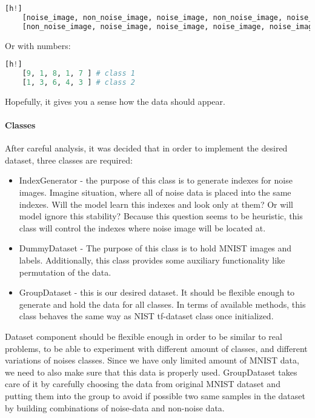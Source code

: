 \begin{lstlisting}[language=Python][h!]
	[noise_image, non_noise_image, noise_image, non_noise_image, noise_image ] # class 1
	[non_noise_image, noise_image, noise_image, noise_image, noise_image ] # class 2
\end{lstlisting}

Or with numbers:
\begin{lstlisting}[language=Python][h!]
	[9, 1, 8, 1, 7 ] # class 1
	[1, 3, 6, 4, 3 ] # class 2
\end{lstlisting}

Hopefully, it gives you a sense how the data should appear.

\paragraph{Classes}

After careful analysis, it was decided that in order to implement
the desired dataset, three classes are required:
\begin{itemize}
	\item IndexGenerator - the purpose of this class is to generate indexes for
		noise images. Imagine situation, where all of noise data is placed into
		the same indexes. Will the model learn this indexes and look only at
		them? Or will model ignore this stability? Because this question seems
		to be heuristic, this class will control the indexes where noise image
		will be located at.
	\item DummyDataset - The purpose of this class is to hold MNIST images
		and labels. Additionally, this class provides some auxiliary functionality
		like permutation of the data.
	\item GroupDataset - this is our desired dataset. It should be flexible
		enough to generate and hold the data for all classes. In terms of
		available methods, this class behaves the same way as NIST tf-dataset class
		once initialized.
\end{itemize}

Dataset component should be flexible enough in order to be similar to real problems,
to be able to experiment with different amount of classes, and
different variations of noises classes. Since we have only limited amount of MNIST data,
we need to also make sure that this data is properly used. GroupDataset takes
care of it by carefully choosing the data from original MNIST dataset and putting
them into the group to avoid if possible two same samples in the dataset by building
combinations of noise-data and non-noise data.

